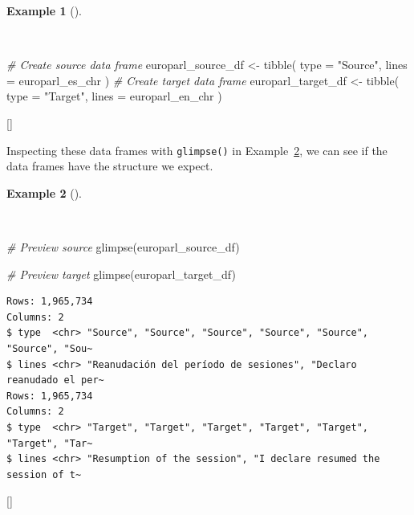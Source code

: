 \documentclass[
  letterpaper,
  krantz1]{latex/krantz-mod}
\newenvironment{Shaded}{\begin{snugshade}}{\end{snugshade}}
\newcommand{\AttributeTok}[1]{\textcolor[rgb]{0.00,0.00,0.00}{#1}}
\newcommand{\CommentTok}[1]{\textcolor[rgb]{0.00,0.00,0.00}{\textit{#1}}}
\newcommand{\FunctionTok}[1]{\textcolor[rgb]{0.00,0.00,0.00}{#1}}
\newcommand{\NormalTok}[1]{\textcolor[rgb]{0.00,0.00,0.00}{#1}}
\newcommand{\OtherTok}[1]{\textcolor[rgb]{0.00,0.00,0.00}{#1}}
\newcommand{\StringTok}[1]{\textcolor[rgb]{0.00,0.00,0.00}{#1}}
\newcommand{\cindex}[1]{%
  \StrSubstitute{#1}{_}{\_}[\temp]%
  \index{\temp}%
}
\theoremstyle{definition}
\theoremstyle{definition}
\newtheorem{example}{Example}[chapter]
\theoremstyle{remark}
\begin{document}
\begin{example}[]\protect\hypertarget{exm-curate-europarl-df}{}\label{exm-curate-europarl-df}

~

\begin{Shaded}
\begin{Highlighting}[numbers=left,,]
\CommentTok{\# Create source data frame}
\NormalTok{europarl\_source\_df }\OtherTok{\textless{}{-}}
  \FunctionTok{tibble}\NormalTok{(}
    \AttributeTok{type =} \StringTok{"Source"}\NormalTok{,}
    \AttributeTok{lines =}\NormalTok{ europarl\_es\_chr}
\NormalTok{  )}
\CommentTok{\# Create target data frame}
\NormalTok{europarl\_target\_df }\OtherTok{\textless{}{-}}
  \FunctionTok{tibble}\NormalTok{(}
    \AttributeTok{type =} \StringTok{"Target"}\NormalTok{,}
    \AttributeTok{lines =}\NormalTok{ europarl\_en\_chr}
\NormalTok{  )}
\end{Highlighting}
\end{Shaded}

\cindex{tibble()}

\end{example}

Inspecting these data frames with \texttt{glimpse()} in
Example~\ref{exm-curate-europarl-glimpse}, we can see if the data frames
have the structure we expect.

\begin{example}[]\protect\hypertarget{exm-curate-europarl-glimpse}{}\label{exm-curate-europarl-glimpse}

~

\begin{Shaded}
\begin{Highlighting}[numbers=left,,]
\CommentTok{\# Preview source}
\FunctionTok{glimpse}\NormalTok{(europarl\_source\_df)}

\CommentTok{\# Preview target}
\FunctionTok{glimpse}\NormalTok{(europarl\_target\_df)}
\end{Highlighting}
\end{Shaded}

\begin{verbatim}
Rows: 1,965,734
Columns: 2
$ type  <chr> "Source", "Source", "Source", "Source", "Source", "Source", "Sou~
$ lines <chr> "Reanudación del período de sesiones", "Declaro reanudado el per~
Rows: 1,965,734
Columns: 2
$ type  <chr> "Target", "Target", "Target", "Target", "Target", "Target", "Tar~
$ lines <chr> "Resumption of the session", "I declare resumed the session of t~
\end{verbatim}

\cindex{glimpse()}

\end{example}
\end{document}
